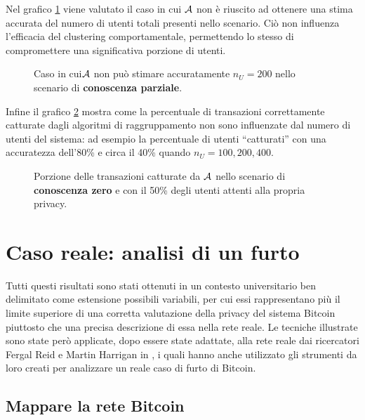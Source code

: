 Nel grafico \ref{userprivacy_fig_3} viene valutato il caso in cui $\mathcal{A}$ non è riuscito ad ottenere una stima accurata del numero di utenti totali presenti nello scenario. Ciò non influenza l'efficacia del clustering comportamentale, permettendo lo stesso di compromettere una significativa porzione di utenti.

\begin{figure}[htbp]
\centering
\caption{Caso in cui$\mathcal{A}$ non può stimare accuratamente $n_U = 200$ nello scenario di \textbf{conoscenza parziale}.\label{userprivacy_fig_3}}
\end{figure}

Infine il grafico \ref{userprivacy_fig_5} mostra come la percentuale di transazioni correttamente catturate dagli algoritmi di raggruppamento non sono influenzate dal numero di utenti del sistema: ad esempio la percentuale di utenti ``catturati'' con una accuratezza dell'80\% e circa il 40\% quando $n_U = 100, 200, 400$.

\begin{figure}[htbp]
\centering
\caption{Porzione delle transazioni catturate da $\mathcal{A}$ nello scenario di \textbf{conoscenza zero} e con il 50\% degli utenti attenti alla propria privacy.\label{userprivacy_fig_5}}
\end{figure}

\section{Caso reale: analisi di un furto}

Tutti questi risultati sono stati ottenuti in un contesto universitario ben delimitato come estensione possibili variabili, per cui essi rappresentano più il limite superiore di una corretta valutazione della privacy del sistema Bitcoin piuttosto che una precisa descrizione di essa nella rete reale.
Le tecniche illustrate sono state però applicate, dopo essere state adattate, alla rete reale dai ricercatori Fergal Reid e Martin Harrigan in \cite{anonimity}, i quali hanno anche utilizzato gli strumenti da loro creati per analizzare un reale caso di furto di Bitcoin.

\subsection{Mappare la rete Bitcoin}


